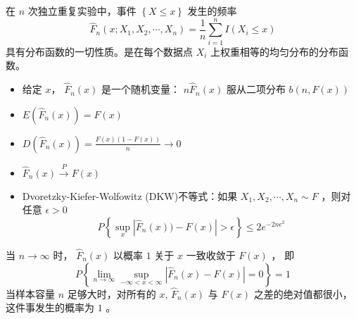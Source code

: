  在 $ n $ 次独立重复实验中，事件 $ \left\{ X \leqslant x \right\}  $ 发生的频率
\begin{equation}
    \hat{F}_n(x;X_1, X_2, \cdots, X_n) = \frac{1}{n} \sum_{i=1}^{n} I(X_i \leqslant x)
\end{equation}
具有分布函数的一切性质。是在每个数据点 $ X_i $ 上权重相等的均匀分布的分布函数。

\begin{itemize}[leftmargin=\subparitemindent]
    \item 给定 $ x $， $ \hat{F}_n(x) $ 是一个随机变量： $ n\hat{F}_n(x) $ 服从二项分布 $ b(n, F(x)) $ 
    \item $ E(\hat{F}_n(x)) = F(x) $
    \item $ D(\hat{F}_n(x)) = \frac{F(x)(1-F(x))}{n} \rightarrow 0 $
    \item $ \hat{F}_n(x) \xrightarrow{P} F(x) $
    \item Dvoretzky-Kiefer-Wolfowitz (DKW)不等式：如果 $ X_1, X_2, \cdots, X_n \sim F $ ，则对任意 $ \epsilon > 0 $
    \begin{equation}
        P\left\{ \sup_x \left| \hat{F}_n(x)) - F(x) \right| > \epsilon \right\}  \leqslant 2e^{-2n\epsilon^2}
    \end{equation}
\end{itemize}

 当 $ n \rightarrow \infty $ 时， $ \hat{F}_n(x) $ 以概率 $ 1 $ 关于 $ x $ 一致收敛于 $ F(x) $ ，
即
\begin{equation}
    P\left\{ \lim_{n\rightarrow\infty} \sup_{-\infty<x<\infty} \left| \hat{F}_n(x) - F(x) \right| = 0 \right\} = 1
\end{equation}
当样本容量 $ n $ 足够大时，对所有的 $ x $,  $ \hat{F}_n(x) $ 与 $ F(x) $ 之差的绝对值都很小，这件事发生的概率为 $ 1 $ 。